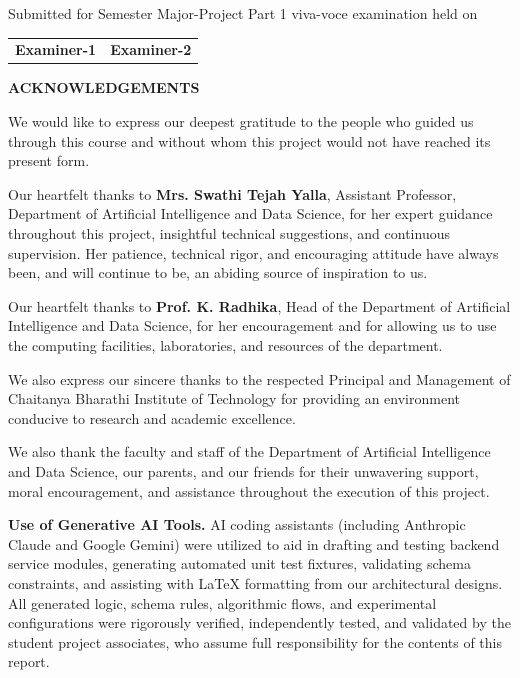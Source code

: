 \documentclass[12pt,a4paper]{report}
\begin{document}
\vspace{2.0cm}

\noindent Submitted for Semester Major-Project Part 1 viva-voce examination held on \underline{\hspace{4cm}}

\vspace{1.5cm}

\noindent
\begin{tabular*}{\textwidth}{@{\extracolsep{\fill}}cc}
    \textbf{Examiner-1} & \textbf{Examiner-2}
\end{tabular*}

\newpage
\begin{center}
    \textbf{\Large ACKNOWLEDGEMENTS}\\[1.0cm]
\end{center}

We would like to express our deepest gratitude to the people who guided us through this course and without whom this project would not have reached its present form.

Our heartfelt thanks to \textbf{Mrs. Swathi Tejah Yalla}, Assistant Professor, Department of Artificial Intelligence and Data Science, for her expert guidance throughout this project, insightful technical suggestions, and continuous supervision. Her patience, technical rigor, and encouraging attitude have always been, and will continue to be, an abiding source of inspiration to us.

Our heartfelt thanks to \textbf{Prof. K. Radhika}, Head of the Department of Artificial Intelligence and Data Science, for her encouragement and for allowing us to use the computing facilities, laboratories, and resources of the department.

We also express our sincere thanks to the respected Principal and Management of Chaitanya Bharathi Institute of Technology for providing an environment conducive to research and academic excellence.

We also thank the faculty and staff of the Department of Artificial Intelligence and Data Science, our parents, and our friends for their unwavering support, moral encouragement, and assistance throughout the execution of this project.

\vspace{1.0cm}
\noindent \textbf{Use of Generative AI Tools.} AI coding assistants (including Anthropic Claude and Google Gemini) were utilized to aid in drafting and testing backend service modules, generating automated unit test fixtures, validating schema constraints, and assisting with \LaTeX{} formatting from our architectural designs. All generated logic, schema rules, algorithmic flows, and experimental configurations were rigorously verified, independently tested, and validated by the student project associates, who assume full responsibility for the contents of this report.
\end{document}
